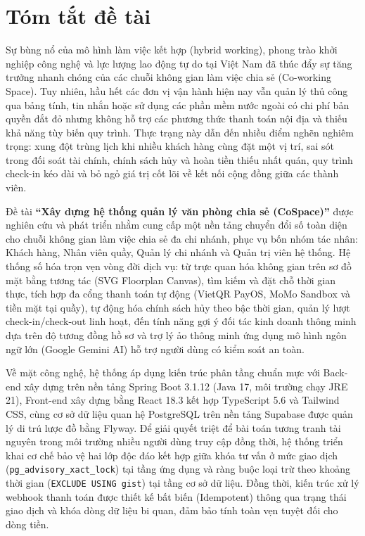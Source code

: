 \chapter*{Tóm tắt đề tài}

Sự bùng nổ của mô hình làm việc kết hợp (hybrid working), phong trào khởi nghiệp công nghệ và lực lượng lao động tự do tại Việt Nam đã thúc đẩy sự tăng trưởng nhanh chóng của các chuỗi không gian làm việc chia sẻ (Co-working Space). Tuy nhiên, hầu hết các đơn vị vận hành hiện nay vẫn quản lý thủ công qua bảng tính, tin nhắn hoặc sử dụng các phần mềm nước ngoài có chi phí bản quyền đắt đỏ nhưng không hỗ trợ các phương thức thanh toán nội địa và thiếu khả năng tùy biến quy trình. Thực trạng này dẫn đến nhiều điểm nghẽn nghiêm trọng: xung đột trùng lịch khi nhiều khách hàng cùng đặt một vị trí, sai sót trong đối soát tài chính, chính sách hủy và hoàn tiền thiếu nhất quán, quy trình check-in kéo dài và bỏ ngỏ giá trị cốt lõi về kết nối cộng đồng giữa các thành viên.

Đề tài \textbf{``Xây dựng hệ thống quản lý văn phòng chia sẻ (CoSpace)''} được nghiên cứu và phát triển nhằm cung cấp một nền tảng chuyển đổi số toàn diện cho chuỗi không gian làm việc chia sẻ đa chi nhánh, phục vụ bốn nhóm tác nhân: Khách hàng, Nhân viên quầy, Quản lý chi nhánh và Quản trị viên hệ thống. Hệ thống số hóa trọn vẹn vòng đời dịch vụ: từ trực quan hóa không gian trên sơ đồ mặt bằng tương tác (SVG Floorplan Canvas), tìm kiếm và đặt chỗ thời gian thực, tích hợp đa cổng thanh toán tự động (VietQR PayOS, MoMo Sandbox và tiền mặt tại quầy), tự động hóa chính sách hủy theo bậc thời gian, quản lý lượt check-in/check-out linh hoạt, đến tính năng gợi ý đối tác kinh doanh thông minh dựa trên độ tương đồng hồ sơ và trợ lý ảo thông minh ứng dụng mô hình ngôn ngữ lớn (Google Gemini AI) hỗ trợ người dùng có kiểm soát an toàn.

Về mặt công nghệ, hệ thống áp dụng kiến trúc phân tầng chuẩn mực với Back-end xây dựng trên nền tảng Spring Boot 3.1.12 (Java 17, môi trường chạy JRE 21), Front-end xây dựng bằng React 18.3 kết hợp TypeScript 5.6 và Tailwind CSS, cùng cơ sở dữ liệu quan hệ PostgreSQL trên nền tảng Supabase được quản lý di trú lược đồ bằng Flyway. Để giải quyết triệt để bài toán tương tranh tài nguyên trong môi trường nhiều người dùng truy cập đồng thời, hệ thống triển khai cơ chế bảo vệ hai lớp độc đáo kết hợp giữa khóa tư vấn ở mức giao dịch (\texttt{pg\_advisory\_xact\_lock}) tại tầng ứng dụng và ràng buộc loại trừ theo khoảng thời gian (\texttt{EXCLUDE USING gist}) tại tầng cơ sở dữ liệu. Đồng thời, kiến trúc xử lý webhook thanh toán được thiết kế bất biến (Idempotent) thông qua trạng thái giao dịch và khóa dòng dữ liệu bi quan, đảm bảo tính toàn vẹn tuyệt đối cho dòng tiền.


